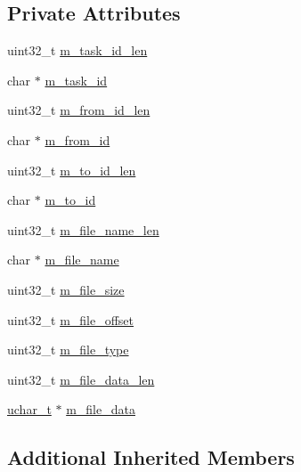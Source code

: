 \subsection*{Private Attributes}
\begin{DoxyCompactItemize}
\item 
uint32\+\_\+t \hyperlink{class_c_im_pdu_client_file_data_a6aab89ec5eb043bce658fff5d08800d9}{m\+\_\+task\+\_\+id\+\_\+len}
\item 
char $\ast$ \hyperlink{class_c_im_pdu_client_file_data_a7cdd9d00d61012e5fabf346d694ee369}{m\+\_\+task\+\_\+id}
\item 
uint32\+\_\+t \hyperlink{class_c_im_pdu_client_file_data_a9ac09253cf58fe311f7d2873af160d64}{m\+\_\+from\+\_\+id\+\_\+len}
\item 
char $\ast$ \hyperlink{class_c_im_pdu_client_file_data_ab0dc944db2ecce12cdc89fd4b1f9aded}{m\+\_\+from\+\_\+id}
\item 
uint32\+\_\+t \hyperlink{class_c_im_pdu_client_file_data_a5febf8fb39c4517b09d7430a479fda52}{m\+\_\+to\+\_\+id\+\_\+len}
\item 
char $\ast$ \hyperlink{class_c_im_pdu_client_file_data_a94bbf5ab5502f4e98a76232f50fa76bd}{m\+\_\+to\+\_\+id}
\item 
uint32\+\_\+t \hyperlink{class_c_im_pdu_client_file_data_a8042edb911d4504dcb29c45b3154af87}{m\+\_\+file\+\_\+name\+\_\+len}
\item 
char $\ast$ \hyperlink{class_c_im_pdu_client_file_data_aafb918a2cacb60076dea267e90639b3f}{m\+\_\+file\+\_\+name}
\item 
uint32\+\_\+t \hyperlink{class_c_im_pdu_client_file_data_a8f4b8ce746787361aa772b8c66153376}{m\+\_\+file\+\_\+size}
\item 
uint32\+\_\+t \hyperlink{class_c_im_pdu_client_file_data_a97d7fc07523035105077650cc7e31973}{m\+\_\+file\+\_\+offset}
\item 
uint32\+\_\+t \hyperlink{class_c_im_pdu_client_file_data_aef1fb1e19f300960b1218bcf794d85dc}{m\+\_\+file\+\_\+type}
\item 
uint32\+\_\+t \hyperlink{class_c_im_pdu_client_file_data_ae37c32bf16ad2c55048e1b1b03b541fb}{m\+\_\+file\+\_\+data\+\_\+len}
\item 
\hyperlink{base_2ostype_8h_a124ea0f8f4a23a0a286b5582137f0b8d}{uchar\+\_\+t} $\ast$ \hyperlink{class_c_im_pdu_client_file_data_a26b5139cb317d57a772d28abb7e81523}{m\+\_\+file\+\_\+data}
\end{DoxyCompactItemize}
\subsection*{Additional Inherited Members}


